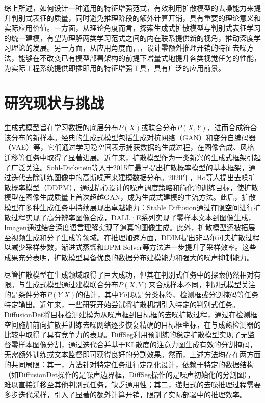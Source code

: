 综上所述，如何设计一种通用的特征增强范式，有效利用扩散模型的去噪能力来提升判别式表征的质量，同时避免推理阶段的额外计算开销，具有重要的理论意义和实际应用价值。一方面，从理论角度而言，探索生成式扩散模型与判别式表征学习的统一建模，有望为理解两类学习范式之间的内在联系提供新的视角，推动深度学习理论的发展。另一方面，从应用角度而言，设计零额外推理开销的特征去噪方法，能够在不改变已有模型部署架构的前提下增量式地提升各类视觉任务的性能，为实际工程系统提供即插即用的特征增强工具，具有广泛的应用前景。

\section{研究现状与挑战}

生成式模型旨在学习数据的底层分布$P(X)$或联合分布$P(X,Y)$，进而合成符合该分布的新样本。经典的生成式模型包括生成对抗网络（GAN）\cite{goodfellow2014generative,karras2019style,mirza2014conditional}和变分自编码器（VAE）\cite{kingma2013auto,van2017neural,zhao2017learning}等，它们通过学习隐空间表示捕获数据的生成过程，在图像合成、风格迁移等任务中取得了显著进展。近年来，扩散模型作为一类新兴的生成式框架引起了广泛关注。Sohl-Dickstein等人\cite{sohl2015deep}于2015年最早提出扩散概率模型的基本框架，通过迭代去除训练图像中的高斯噪声来建模数据分布。2020年，Ho等人\cite{ho2020denoising}提出去噪扩散概率模型（DDPM），通过精心设计的噪声调度策略和简化的训练目标，使扩散模型在图像生成质量上首次超越GAN，成为生成式建模的主流方法。此后，扩散模型在多种生成任务中持续展现出卓越能力：Stable Diffusion\cite{rombach2022high}通过在隐空间进行扩散过程实现了高分辨率图像合成，DALL·E\cite{ramesh2021zero}系列实现了零样本文本到图像生成，Imagen\cite{saharia2022photorealistic}通过结合深度语言理解实现了逼真的图像生成。此外，扩散模型还被拓展至视频生成\cite{ho2022imagen}和分子生成\cite{hoogeboom2022equivariant}等领域。在推理加速方面，DDIM\cite{song2020denoising}提出非马尔可夫扩散过程以减少采样步数，渐进式蒸馏\cite{salimans2022progressive}和DPM-Solver\cite{lu2022dpm}等方法进一步提升了采样效率。这些成果充分表明，扩散模型具备优良的数据分布建模能力和强大的噪声抑制能力\cite{10419041}。

尽管扩散模型在生成领域取得了巨大成功，但其在判别式任务中的探索仍然相对有限。与生成式模型通过建模联合分布$P(X,Y)$来合成样本不同，判别式模型关注的是条件分布$P(Y|X)$的估计，其中$Y$可以是分类标签、检测框或分割掩码等任务特定输出。近年来，一些研究开始尝试将扩散机制引入特定的判别式任务。DiffusionDet\cite{chen2023diffusiondet}将目标检测建模为从噪声框到目标框的去噪扩散过程，通过在检测框空间施加前向扩散并训练去噪网络逐步恢复精确的目标框坐标，在与成熟检测器的比较中取得了具有竞争力的表现。DiffSeg\cite{tian2023diffuse}利用预训练的稳定扩散模型实现了无监督零样本图像分割，通过迭代合并基于KL散度的注意力图生成有效的分割掩码，无需额外训练或文本监督即可获得良好的分割效果。然而，上述方法均存在两方面的共同局限：其一，方法针对特定任务进行定制化设计，依赖于特定的数据结构（如DiffusionDet操作的是噪声边界框，DiffSeg操作的是噪声初始化的分割图），难以直接迁移至其他判别式任务，缺乏通用性；其二，递归式的去噪推理过程需要多步迭代采样，引入了显著的额外计算开销，限制了实际部署中的推理效率。

